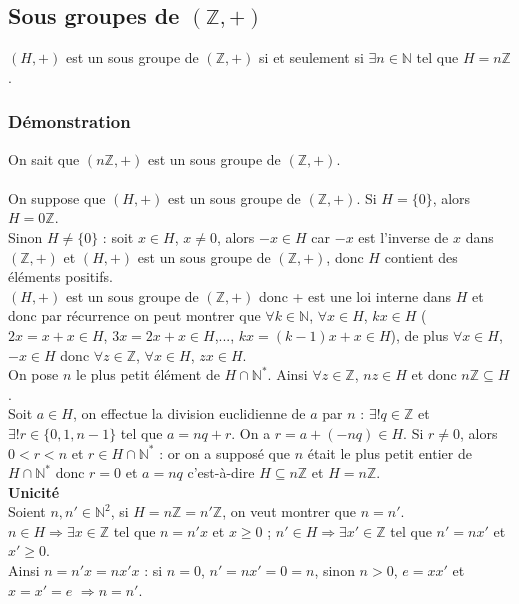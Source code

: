 \documentclass[a4paper,10pt]{book} %
\newcommand{\N}{\mathbb{N}}
\newcommand{\Z}{\mathbb{Z}}
\begin{document}
\newpage

\subsection{Sous groupes de $(\Z,+)$}\label{lemme_clé}
$(H,+)$ est un sous groupe de $(\Z,+)$ si et seulement si $\exists n\in \N$ tel que $H=n\Z$.

\subsubsection{Démonstration}
On sait que $(n\Z,+)$ est un sous groupe de $(\Z,+)$.\\\\

On suppose que $(H,+)$ est un sous groupe de $(\Z,+)$. Si $H=\{0\}$, alors $H=0\Z$.\\

Sinon $H\neq \{0\}$ : soit $x\in H$, $x\neq 0$, alors $-x\in H$ car $-x$ est l'inverse de $x$ dans $(\Z,+)$
et $(H,+)$ est un sous groupe de $(\Z,+)$, donc $H$ contient des éléments positifs.\\

$(H,+)$ est un sous groupe de $(\Z,+)$ donc + est une loi interne dans $H$ et donc par récurrence on peut montrer que $\forall k\in \N$, $\forall x\in H$, $kx\in H$ ($2x=x+x\in H$, $3x=2x+x\in H$,..., $kx=(k-1)x+x\in H$), de plus $\forall x\in H$, $-x\in H$ donc $\forall z\in \Z$, $\forall x\in H$, $zx\in H$.\\

On pose $n$ le plus petit élément de $H\cap \N^*$. Ainsi $\forall z\in \Z$, $nz\in H$ et donc $n\Z\subseteq H$.\\

Soit $a \in H$, on effectue la division euclidienne de $a$ par $n$ : $\exists! q\in \Z$ et $\exists! r\in \{0,1,n-1\}$ tel que $a=nq+r$. On a $r=a+(-nq)\in H$. Si $r\neq 0$, alors $0<r<n$ et $r\in H\cap \N^*$ : or on a supposé que $n$ était le plus petit entier de $H\cap\N^*$ donc $r=0$ et $a=nq$ c'est-à-dire $H\subseteq n\Z$ et $H=n\Z$.\\

\textbf{Unicité}\\
Soient $n,n'\in \N^2$, si $H=n\Z=n'\Z$, on veut montrer que $n=n'$.\\

$n\in H\Rightarrow \exists x\in \Z$ tel que $n=n'x$ et $x\geq 0$ ; $n'\in H \Rightarrow \exists x'\in \Z$ tel que $n'=nx'$ et $x'\geq 0$.\\
Ainsi $n=n'x=nx'x$ : si $n=0$, $n'=nx'=0=n$, sinon $n>0$, $e=xx'$ et $x=x'=e$ $\Rightarrow  n=n'$.
\end{document}
